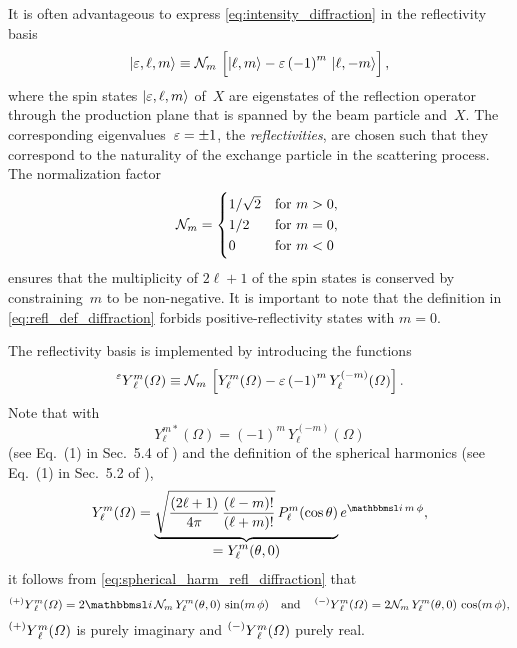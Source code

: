 It is often advantageous to express \cref{eq:intensity_diffraction} in
the reflectivity basis
\begin{equation}
  \label{eq:refl_def_diffraction}
  \ket{\refl, \ell, m}
  \equiv \mathcal{N}_m\, \sBrk[2]{\ket{\ell, m} - \refl\, {(-1)}^m\, \ket{\ell, {-m}}},
\end{equation}
where the spin states $\ket{\varepsilon, \ell, m}$ of~$X$ are eigenstates of
the reflection operator through the production plane that is spanned
by the beam particle and~$X$.  The corresponding eigenvalues~$\varepsilon =
\pm 1$, the \emph{reflectivities}, are chosen such that they
correspond to the naturality of the exchange particle in the
scattering process.  The normalization factor
\begin{equation}
  \label{eq:refl_norm}
  \mathcal{N}_m
  = \begin{cases*}
      1 / \sqrt{2} & for $m > 0$, \\
      1 / 2        & for $m = 0$, \\
      0            & for $m < 0$
    \end{cases*}
\end{equation}
ensures that the multiplicity of $2 \ell + 1$ of the spin states is
conserved by constraining~$m$ to be non-negative.  It is important to
note that the definition in \cref{eq:refl_def_diffraction} forbids
positive-reflectivity states with $m = 0$.

The reflectivity basis is implemented by introducing the functions
\begin{equation}
  \label{eq:spherical_harm_refl_diffraction}
  \prescript{\refl}{}{Y}_\ell^m(\Omega)
  \equiv \mathcal{N}_m\, \sBrk[2]{Y_\ell^m(\Omega) - \refl\, {(-1)}^m\, Y_\ell^{(-m)}(\Omega)}.
\end{equation}
Note that with
\begin{equation}
  \label{eq:spherical_harm_sym}
  Y_\ell^{m *}(\Omega)
  = {(-1)}^m\, Y_\ell^{(-m)}(\Omega)
\end{equation}
(see Eq.~(1) in Sec.~5.4 of ) and the
definition of the spherical harmonics (see Eq.~(1) in Sec.~5.2 of
),
\begin{equation}
  \label{eq:sspherical_harm_def}
  Y_\ell^m(\Omega)
  = \dUnderbrace{\sqrt{\frac{(2 \ell + 1)}{4 \pi}\, \frac{(\ell -m)!}{(\ell + m)!}}\, P_\ell^m(\cos\theta)}{= Y_\ell^m(\theta, 0)}\, e^{\imag\, m\, \phi},
\end{equation}
it follows
from \cref{eq:spherical_harm_refl_diffraction} that
\begin{equation}
  \prescript{(+)}{}{Y}_\ell^m(\Omega)
  = 2 \imag\, \mathcal{N}_m\, Y_\ell^m(\theta, 0)\, \sin(m\, \phi)
  \quad\text{and}\quad
  \prescript{(-)}{}{Y}_\ell^m(\Omega)
  = 2 \mathcal{N}_m\, Y_\ell^m(\theta, 0)\, \cos(m\, \phi),
\end{equation}
\ie $\prescript{(+)}{}{Y}_\ell^m(\Omega)$ is purely imaginary and
$\prescript{(-)}{}{Y}_\ell^m(\Omega)$ purely real.

